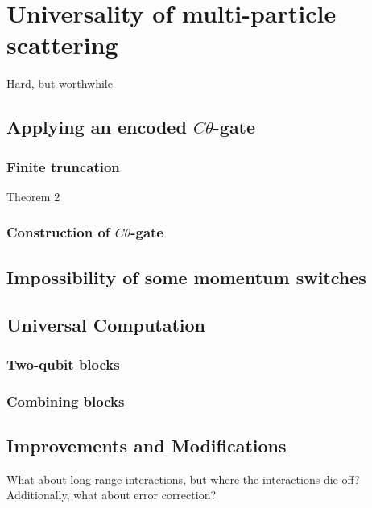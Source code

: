 \documentclass[../thesis-main/thesis-main]{subfiles}
\begin{document}
\chapter{Universality of multi-particle scattering}


Hard, but worthwhile






\section{Applying an encoded $C\theta$-gate}

\subsection{Finite truncation}

Theorem 2

\subsection{Construction of $C\theta$-gate}

\section{Impossibility of some momentum switches}

\section{Universal Computation}
\subsection{Two-qubit blocks}
\subsection{Combining blocks}


\section{Improvements and Modifications}

What about long-range interactions, but where the interactions die off?
Additionally, what about error correction?
\end{document}
